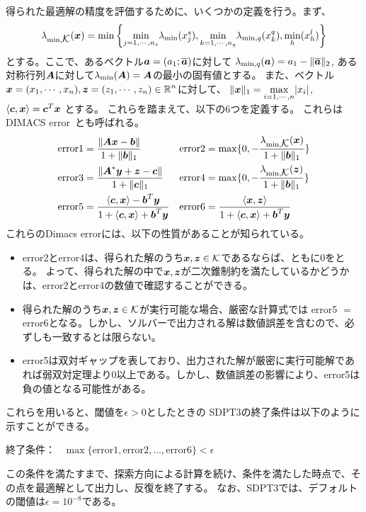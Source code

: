 \documentclass[11pt,a4paper,dvipdfmx,titlepage,uplatex]{jsarticle}
\theoremstyle{mystyle}
\newcommand{\0}{\mathbf{0}}
\def\a{\mbox{\boldmath $a$}}
\def\b{\mbox{\boldmath $b$}}
\def\c{\mbox{\boldmath $c$}}
\def\x{\mbox{\boldmath $x$}}
\def\y{\mbox{\boldmath $y$}}
\def\z{\mbox{\boldmath $z$}}
\def\A{\mbox{\boldmath $A$}}
\def\KC{\mbox{$\cal K$}}
\def\Real{\mbox{$\mathbb{R}$}}
\begin{document}
得られた最適解の精度を評価するために、いくつかの定義を行う。まず、
\begin{align}
  \lambda_{\min,\KC} (\x) = \min \left\{ \underset{j=1,\cdots,n_s}{\min} \lambda_{\min} (x_j^s) , \underset{k=1,\cdots,n_q}{\min} \lambda_{\min,q} (x_k^q) , \underset{h}{\min} (x_h^l) \right\}
\end{align}
とする。ここで、あるベクトル$\a = (a_1 ; \overline{\a})$に対して
$\lambda_{\min,q} (\a) = a_1 - \|\overline{\a}\|_2$,
ある対称行列$\A$に対して$\lambda_{\min} (\A) = \A$の最小の固有値とする。
また、ベクトル$\x = (x_1 , \cdots , x_n) , \z = (z_1 , \cdots , z_n) \in \Real^n$に対して、
$\|\x\|_1 = \underset{i=1,\cdots,n}{\max} |x_i|$,
$\langle \c,\x \rangle = \c^T \x$
とする。
これらを踏まえて、以下の6つを定義する。
これらはDIMACS error~\cite{mittelmann2003independent}とも呼ばれる。
\begin{align}
			\text{error1} &= \frac{\|\A \x - \b\|}{1 + \|\b\|_1} &
			\text{error2} &= \max \{ 0, - \frac{\lambda_{\min , \KC} (\x)}{1 + \|\b\|_1} \} \\
			\text{error3} &= \frac{\|\A^* \y + \z - \c\|}{1 + \|\c\|_1} &
			\text{error4} &= \max \{ 0, - \frac{\lambda_{\min , \KC} (\z)}{1 + \|\b\|_1} \} \\
			\text{error5} &= \frac{\langle \c,\x \rangle - \b^T \y}{1 + \langle \c,\x \rangle + \b^T \y} &
			\text{error6} &= \frac{\langle \x,\z \rangle}{1 + \langle \c,\x \rangle + \b^T \y}
\end{align}
これらのDimacs errorには、以下の性質があることが知られている。
\begin{itemize}
  \item error2とerror4は、得られた解のうち$\x , \z \in \KC$であるならば、ともに0をとる。
  よって、得られた解の中で$\x,\z$が二次錐制約を満たしているかどうかは、error2とerror4の数値で確認することができる。
  \item 得られた解のうち$\x , \z \in \KC$が実行可能な場合、厳密な計算式では
  error5 $=$ error6となる。しかし、ソルバーで出力される解は数値誤差を含むので、必ずしも一致するとは限らない。
  \item error5は双対ギャップを表しており、出力された解が厳密に実行可能解であれば弱双対定理より$0$以上である。しかし、数値誤差の影響により、error5は負の値となる可能性がある。
\end{itemize}

これらを用いると、閾値を$\epsilon>0$としたときの
SDPT3の終了条件は以下のように示すことができる。
\begin{center}
  終了条件： \ $\max\{\text{error}1, \text{error}2, \dots, \text{error}6\} < \epsilon$
\end{center}
この条件を満たすまで、探索方向による計算を続け、条件を満たした時点で、その点を最適解として出力し、反復を終了する。
なお、SDPT3では、デフォルトの閾値は$\epsilon = 10^{-8}$である。
\end{document}
